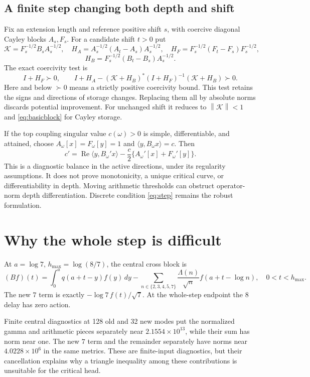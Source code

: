\documentclass[11pt]{article}
\theoremstyle{remark}\newtheorem{remark}[theorem]{Remark}
\newcommand{\Rea}{\operatorname{Re}}
\newcommand{\norm}[1]{\left\|#1\right\|}
\newcommand{\ip}[2]{\langle #1,#2\rangle}
\begin{document}
\subsection{A finite step changing both depth and shift}
Fix an extension length and reference positive shift $s$, with coercive diagonal Cayley blocks $A_s,F_s$. For a candidate shift $t>0$ put
\[
 \mathcal K=F_s^{-1/2}B_sA_s^{-1/2},\quad
 H_A=A_s^{-1/2}(A_t-A_s)A_s^{-1/2},\quad
 H_F=F_s^{-1/2}(F_t-F_s)F_s^{-1/2},
\]
\[
 H_B=F_s^{-1/2}(B_t-B_s)A_s^{-1/2}.
\]
The exact coercivity test is
\begin{equation}\label{eq:step}
 I+H_F\succ0,\qquad
 I+H_A-(\mathcal K+H_B)^*(I+H_F)^{-1}(\mathcal K+H_B)\succ0.
\end{equation}
Here and below $\succ0$ means a strictly positive coercivity bound. This test retains the signs and directions of storage changes. Replacing them all by absolute norms discards potential improvement. For unchanged shift it reduces to $\norm{\mathcal K}<1$ and \eqref{eq:basicblock} for Cayley storage.

If the top coupling singular value $c(\omega)>0$ is simple, differentiable, and attained, choose $A_\omega[x]=F_\omega[y]=1$ and $\ip y{B_\omega x}=c$. Then
\[
 c'=\Rea\ip y{B_\omega'x}-\frac c2\{A_\omega'[x]+F_\omega'[y]\}.
\]
This is a diagnostic balance in the active directions, under its regularity assumptions. It does not prove monotonicity, a unique critical curve, or differentiability in depth. Moving arithmetic thresholds can obstruct operator-norm depth differentiation. Discrete condition \eqref{eq:step} remains the robust formulation.

\section{Why the whole step is difficult}\label{sec:whole}

At $a=\log7$, $h_{\max}=\log(8/7)$, the central cross block is
\begin{equation}\label{eq:B}
 (Bf)(t)=\int_0^a q(a+t-y)f(y)\,dy
 -\sum_{n\in\{2,3,4,5,7\}}\frac{\Lambda(n)}{\sqrt n}f(a+t-\log n),\quad0<t<h_{\max}.
\end{equation}
The new $7$ term is exactly $-\log7\,f(t)/\sqrt7$. At the whole-step endpoint the $8$ delay has zero action.

Finite central diagnostics at 128 old and 32 new modes put the normalized gamma and arithmetic pieces separately near $2.1554\times10^{13}$, while their sum has norm near one. The new $7$ term and the remainder separately have norms near $4.0228\times10^6$ in the same metrics. These are finite-input diagnostics, but their cancellation explains why a triangle inequality among these contributions is unsuitable for the critical head.
\end{document}
